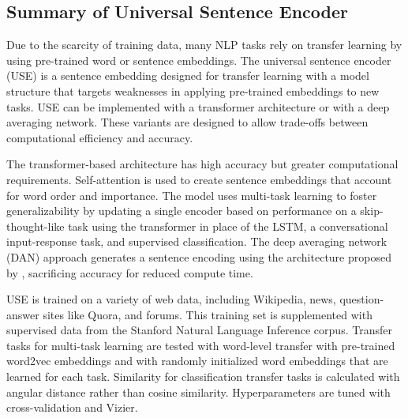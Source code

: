 

\subsection{Summary of Universal Sentence Encoder}

Due to the scarcity of training data, many NLP tasks rely on transfer learning by using pre-trained word or sentence embeddings. The universal sentence encoder (USE) \cite{use} is a sentence embedding designed for transfer learning with a model structure that targets weaknesses in applying pre-trained embeddings to new tasks. USE can be implemented with a transformer architecture or with a deep averaging network. These variants are designed to allow trade-offs between computational efficiency and accuracy. 

The transformer-based architecture has high accuracy but greater computational requirements. Self-attention \cite{attention} is used to create sentence embeddings that account for word order and importance. The model uses multi-task learning to foster generalizability by updating a single encoder based on performance on a skip-thought-like task using the transformer in place of the LSTM, a conversational input-response task, and supervised classification. The deep averaging network (DAN) approach generates a sentence encoding using the architecture proposed by \cite{dan}, sacrificing accuracy for reduced compute time.

USE is trained on a variety of web data, including Wikipedia, news, question-answer sites like Quora, and forums. This training set is supplemented with supervised data from the Stanford Natural Language Inference corpus. Transfer tasks for multi-task learning are tested with word-level transfer with pre-trained word2vec embeddings and with randomly initialized word embeddings that are learned for each task. Similarity for classification transfer tasks is calculated with angular distance rather than cosine similarity. Hyperparameters are tuned with cross-validation and Vizier. 

